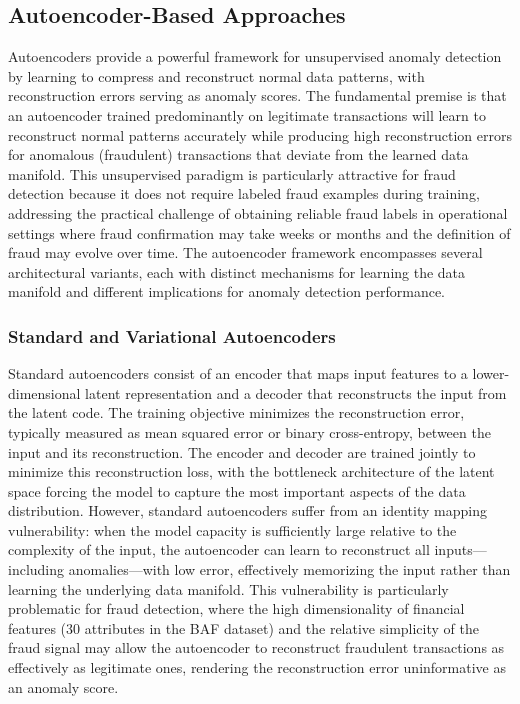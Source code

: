 \subsection{Autoencoder-Based Approaches}

Autoencoders provide a powerful framework for unsupervised anomaly detection by
learning to compress and reconstruct normal data patterns, with reconstruction
errors serving as anomaly scores. The fundamental premise is that an autoencoder
trained predominantly on legitimate transactions will learn to reconstruct
normal patterns accurately while producing high reconstruction errors for
anomalous (fraudulent) transactions that deviate from the learned data manifold.
This unsupervised paradigm is particularly attractive for fraud detection
because it does not require labeled fraud examples during training, addressing
the practical challenge of obtaining reliable fraud labels in operational
settings where fraud confirmation may take weeks or months and the definition of
fraud may evolve over time. The autoencoder framework encompasses several
architectural variants, each with distinct mechanisms for learning the data
manifold and different implications for anomaly detection performance.

\subsubsection{Standard and Variational Autoencoders}

Standard autoencoders consist of an encoder that maps input features to a lower-
dimensional latent representation and a decoder that reconstructs the input from
the latent code. The training objective minimizes the reconstruction error,
typically measured as mean squared error or binary cross-entropy, between the
input and its reconstruction. The encoder and decoder are trained jointly to
minimize this reconstruction loss, with the bottleneck architecture of the
latent space forcing the model to capture the most important aspects of the data
distribution. However, standard autoencoders suffer from an identity mapping
vulnerability: when the model capacity is sufficiently large relative to the
complexity of the input, the autoencoder can learn to reconstruct all inputs---
including anomalies---with low error, effectively memorizing the input rather
than learning the underlying data manifold. This vulnerability is particularly
problematic for fraud detection, where the high dimensionality of financial
features (30 attributes in the BAF dataset) and the relative simplicity of the
fraud signal may allow the autoencoder to reconstruct fraudulent transactions as
effectively as legitimate ones, rendering the reconstruction error uninformative
as an anomaly score.

